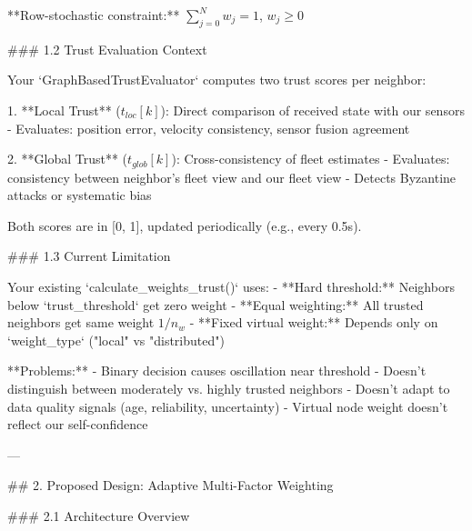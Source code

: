 **Row-stochastic constraint:** \(\sum_{j=0}^{N} w_j = 1\), \(w_j \geq 0\)

### 1.2 Trust Evaluation Context

Your `GraphBasedTrustEvaluator` computes two trust scores per neighbor:

1. **Local Trust** (\(t_{loc}[k]\)): Direct comparison of received state with our sensors
   - Evaluates: position error, velocity consistency, sensor fusion agreement
   
2. **Global Trust** (\(t_{glob}[k]\)): Cross-consistency of fleet estimates
   - Evaluates: consistency between neighbor's fleet view and our fleet view
   - Detects Byzantine attacks or systematic bias

Both scores are in [0, 1], updated periodically (e.g., every 0.5s).

### 1.3 Current Limitation

Your existing `calculate_weights_trust()` uses:
- **Hard threshold:** Neighbors below `trust_threshold` get zero weight
- **Equal weighting:** All trusted neighbors get same weight \(1/n_w\)
- **Fixed virtual weight:** Depends only on `weight_type` ("local" vs "distributed")

**Problems:**
- Binary decision causes oscillation near threshold
- Doesn't distinguish between moderately vs. highly trusted neighbors
- Doesn't adapt to data quality signals (age, reliability, uncertainty)
- Virtual node weight doesn't reflect our self-confidence

---

## 2. Proposed Design: Adaptive Multi-Factor Weighting

### 2.1 Architecture Overview

